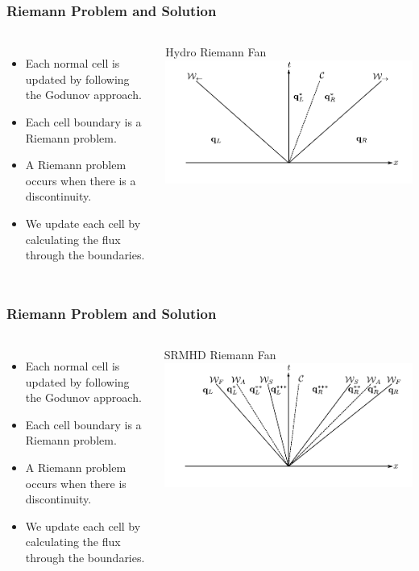 \documentclass{beamer}
\begin{document}
\begin{frame}
\frametitle{Riemann Problem and Solution}
\begin{columns}
\begin{itemize}
\item{Each normal cell is updated by following the Godunov approach.}
\item{Each cell boundary is a Riemann problem.}
\item{A Riemann problem occurs when there is a discontinuity.}
\item{We update each cell by calculating the flux through the boundaries.}
\end{itemize}
\centering
Hydro Riemann Fan
\includegraphics[width=\textwidth]{../images/euler_wave.pdf}
\end{columns}
\end{frame}

\begin{frame}
\frametitle{Riemann Problem and Solution}
\begin{columns}
\begin{itemize}
\item{Each normal cell is updated by following the Godunov approach.}
\item{Each cell boundary is a Riemann problem.}
\item{A Riemann problem occurs when there is discontinuity.}
\item{We update each cell by calculating the flux through the boundaries.}
\end{itemize}
\centering
SRMHD Riemann Fan
\includegraphics[width=\textwidth]{../images/srmhd_wave.pdf}
\end{columns}
\end{frame}
\end{document}
